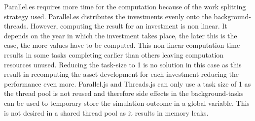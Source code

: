 Parallel.es requires more time for the computation because of the work splitting strategy used. Parallel.es distributes the investments evenly onto the background-threads. However, computing the result for an investment is non linear. It depends on the year in which the investment takes place, the later this is the case, the more values have to be computed. This non linear computation time results in some tasks completing earlier than others leaving computation resources unused. Reducing the task-size to 1 is no solution in this case as this result in recomputing the asset development for each investment reducing the performance even more. Parallel.js and Threads.js can only use a task size of 1 as the thread pool is not reused and therefore side effects in the background-tasks can be used to temporary store the simulation outcome in a global variable. This is not desired in a shared thread pool as it results in memory leaks.
